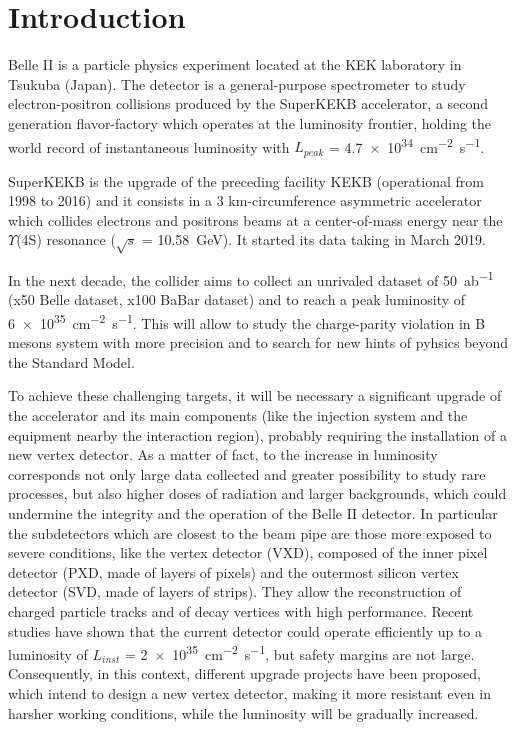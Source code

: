 

\chapter*{Introduction}

Belle II is a particle physics experiment located at the KEK laboratory in Tsukuba (Japan). The detector is a general-purpose spectrometer to study electron-positron collisions produced by the SuperKEKB accelerator, a second generation flavor-factory which operates at the luminosity frontier, holding the world record of instantaneous luminosity with $L_{peak}$ = \SI{4.7e34}{cm^{-2}.s^{-1}}.

SuperKEKB is the upgrade of the preceding facility KEKB (operational from 1998 to 2016) and it consists in a 3 km-circumference asymmetric accelerator which collides electrons and positrons beams at a center-of-mass energy near the $\Upsilon$(4S) resonance ($\sqrt{s}$ = \SI{10.58}{GeV}). It started its data taking in March 2019.

In the next decade, the collider aims to collect  an unrivaled dataset of \SI{50}{ab^{-1}} (x50 Belle dataset, x100 BaBar dataset) and to reach a peak luminosity of \SI{6e35}{cm^{-2}.s^{-1}}. This will allow to study the charge-parity violation in B mesons system with more precision and to search for new hints of pyhsics beyond the Standard Model.

To achieve these challenging targets, it will be necessary a significant upgrade of the accelerator and its main components (like the injection system and the equipment nearby the interaction region), probably requiring the installation of a new vertex detector. As a matter of fact, to the increase in luminosity corresponds not only large data collected and greater possibility to study rare processes, but also higher doses of radiation and larger backgrounds, which could undermine the integrity and the operation of the Belle II detector.
In particular the subdetectors which are closest to the beam pipe are those more exposed to severe conditions, like the vertex detector (VXD), composed of the inner pixel detector (PXD, made of layers of pixels) and the outermost silicon vertex detector (SVD, made of layers of strips). They allow the reconstruction of charged particle tracks and of decay vertices with high performance. Recent studies have shown that the current detector could operate efficiently up to a luminosity of $L_{inst}$ = \SI{2e35}{cm^{-2}.s^{-1}}, but safety margins are not large. 
Consequently, in this context, different upgrade projects have been proposed, which intend to design a new vertex detector, making it more resistant even in harsher working conditions, while the luminosity will be gradually increased. 

